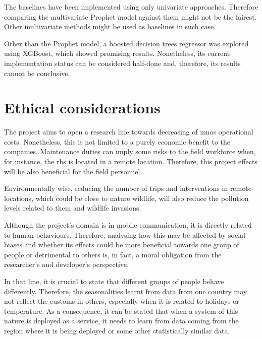 The baselines have been implemented using only univariate approaches. Therefore comparing the multivariate Prophet model against them might not be the fairest. Other multivariate methods might be used as baselines in such case.  

Other than the Prophet model, a boosted decision trees regressor was explored using XGBoost, which showed promising results. Nonetheless, its current implementation status can be considered half-done and, therefore, its results cannot be conclusive.


\section{Ethical considerations}
\label{sec:work-wider-context}

The project aims to open a research line towards decreasing of \acp{mno} operational costs. Nonetheless, this is not limited to a purely economic benefit to the companies. Maintenance duties can imply some risks to the field workforce when, for instance, the \ac{rbs} is located in a remote location. Therefore, this project effects will be also beneficial for the field personnel. 

Environmentally wise, reducing the number of trips and interventions in remote locations, which could be close to nature wildlife, will also reduce the pollution levels related to them and wildlife invasions.

Although the project's domain is in mobile communication, it is directly related to human behaviours. Therefore, analysing how this may be affected by social biases and whether its effects could be more beneficial towards one group of people or detrimental to others is, in fact, a moral obligation from the researcher's and developer's perspective. 

In that line, it is crucial to state that different groups of people behave differently. Therefore, the seasonalities learnt from data from one country may not reflect the customs in others, especially when it is related to holidays or temperature. As a consequence, it can be stated that when a system of this nature is deployed as a service, it needs to learn from data coming from the region where it is being deployed or some other statistically similar data. 